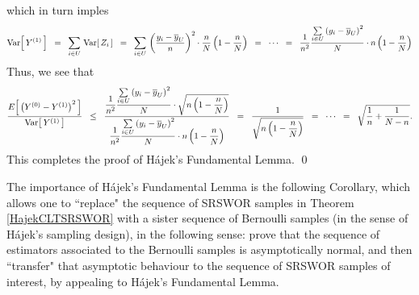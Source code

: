 which in turn imples
\begin{equation*}
\textnormal{Var}\!\left[\,Y^{(1)}\,\right]
\;\;=\;\; \sum_{i\in U}\,\textnormal{Var}\!\left[\,Z_{i}\,\right]
\;\;=\;\; \sum_{i\in U}\,\left(\dfrac{y_{i} - \overline{y}_{U}}{n}\right)^{2}\cdot\dfrac{n}{N}\left(1 - \dfrac{n}{N}\right)
\;\;=\;\; \cdots
\;\;=\;\; \dfrac{1}{n^{2}}
\dfrac{\underset{i\in U}{\sum}\left(y_{i}-\overline{y}_{U}\right)^{2}}{N}
\cdot n\left(1 - \dfrac{n}{N}\right)
\end{equation*}
Thus, we see that
\begin{equation*}
\dfrac{E\!\left[\,\left(Y^{(0)} - Y^{(1)}\right)^{2}\,\right]}{\textnormal{Var}\!\left[\,Y^{(1)}\,\right]}
\;\;\leq\;\;
\dfrac{
\dfrac{1}{n^{2}}
\dfrac{\underset{i\in U}{\sum}\left(y_{i}-\overline{y}_{U}\right)^{2}}{N}
\cdot \sqrt{n\left(1 - \dfrac{n}{N}\right)}
}{
\dfrac{1}{n^{2}}
\dfrac{\underset{i\in U}{\sum}\left(y_{i}-\overline{y}_{U}\right)^{2}}{N}
\cdot n\left(1 - \dfrac{n}{N}\right)
}
\;\;=\;\; \dfrac{1}{\sqrt{n\left(1 - \dfrac{n}{N}\right)}}
\;\;=\;\; \cdots \;\; = \;\; \sqrt{\dfrac{1}{n} + \dfrac{1}{N-n}}.
\end{equation*}
This completes the proof of H\'ajek's Fundamental Lemma.
\qed

\begin{remark}
The importance of H\'ajek's Fundamental Lemma is the following Corollary,
which allows one to ``replace" the sequence of SRSWOR samples in
Theorem \ref{HajekCLTSRSWOR} with a sister sequence of Bernoulli samples
(in the sense of H\'ajek's sampling design), in the following sense: prove that
the sequence of estimators associated to the Bernoulli samples is asymptotically
normal, and then ``transfer" that asymptotic behaviour to the sequence of
SRSWOR samples of interest, by appealing to H\'ajek's Fundamental Lemma.
\end{remark}

